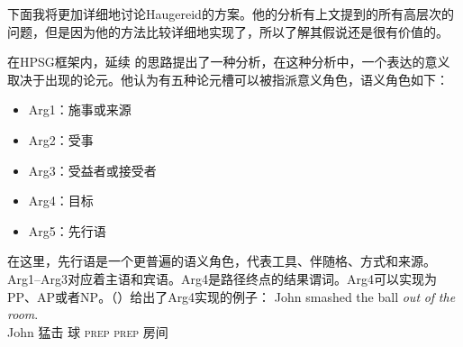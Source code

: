 \begin{exe}
\begin{xlist}[iv.]
\begin{exe}
\begin{xlist}[iv.]
下面我将更加详细地讨论Haugereid\citeyearpar{Haugereid2007a}的方案。他的分析有上文提到的所有高层次的问题，但是因为他的方法比较详细地实现了，所以了解其假说还是很有价值的。

\mbox{}\citet{Haugereid2007a}在HPSG框架内，延续 \citet{Borer2005a-u}的思路提出了一种分析，在这种分析中，一个表达的意义取决于出现的论元。他认为有五种论元槽可以被指派意义角色，语义角色如下：
\begin{itemize}
\item Arg1：施事或来源
\item Arg2：受事
\item Arg3：受益者或接受者
\item Arg4：目标
\item Arg5：先行语
\end{itemize}
在这里，先行语是一个更普遍的语义角色，代表工具、伴随格、方式和来源。Arg1--Arg3对应着主语和宾语。Arg4是路径终点的结果谓词。Arg4可以实现为PP、AP或者NP。（）给出了Arg4实现的例子：
\eal
\ex 
\gll John smashed the ball \emph{out} \emph{of} \emph{the} \emph{room}.\\
     John 猛击  球 \textsc{prep} \textsc{prep}  房间\\

\end{xlist}
\end{exe}
\end{xlist}
\end{exe}
